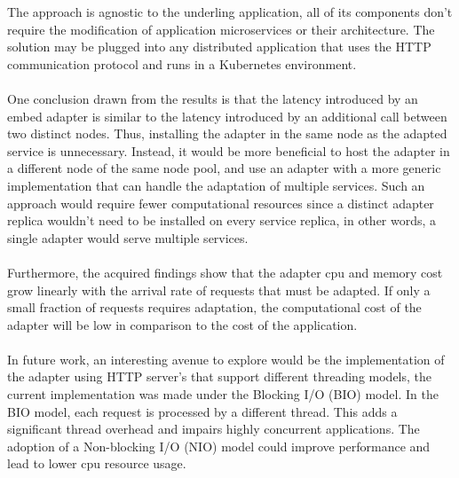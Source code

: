 The approach is agnostic to the underling application, all of its components don't require the modification of application microservices or their architecture.
The solution may be plugged into any distributed application that uses the HTTP communication protocol and runs in a Kubernetes environment.

\paragraph{}

One conclusion drawn from the results is that the latency introduced by an embed adapter is similar to the latency introduced by an additional call between two distinct nodes.
Thus, installing the adapter in the same node as the adapted service is unnecessary.
Instead, it would be more beneficial to host the adapter in a different node of the same node pool, and use an adapter with a more generic implementation that can handle the adaptation of multiple services.
Such an approach would require fewer computational resources since a distinct adapter replica wouldn't need to be installed on every service replica, in other words, a single adapter would serve multiple services.

\paragraph{}

Furthermore, the acquired findings show that the adapter cpu and memory cost grow linearly with the arrival rate of requests that must be adapted.
If only a small fraction of requests requires adaptation, the computational cost of the adapter will be low in comparison to the cost of the application.

\paragraph{}

In future work, an interesting avenue to explore would be the implementation of the adapter using HTTP server's that support different threading models, the current implementation
was made under the Blocking I/O (BIO) model.
In the BIO model, each request is processed by a different thread.
This adds a significant thread overhead and impairs highly concurrent applications.
The adoption of a Non-blocking I/O (NIO) model could improve performance and lead to lower cpu resource usage.

\paragraph{}

